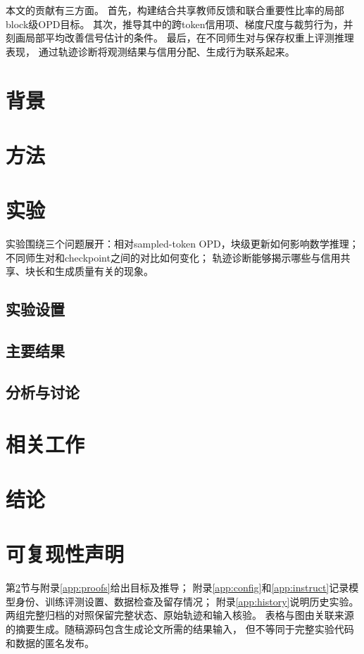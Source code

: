 本文的贡献有三方面。
首先，构建结合共享教师反馈和联合重要性比率的局部block级OPD目标。
其次，推导其中的跨token信用项、梯度尺度与裁剪行为，并刻画局部平均改善信号估计的条件。
最后，在不同师生对与保存权重上评测推理表现，
通过轨迹诊断将观测结果与信用分配、生成行为联系起来。

\section{背景}
\label{sec:background}


\section{方法}
\label{sec:method}


\section{实验}
实验围绕三个问题展开：相对sampled-token OPD，块级更新如何影响数学推理；
不同师生对和checkpoint之间的对比如何变化；
轨迹诊断能够揭示哪些与信用共享、块长和生成质量有关的现象。

\subsection{实验设置}
\label{sec:protocol}


\subsection{主要结果}
\label{sec:results}


\subsection{分析与讨论}
\label{sec:analysis}


\section{相关工作}
\label{sec:related}


\section{结论}

\FloatBarrier
\label{mainend}

\section*{可复现性声明}
第\ref{sec:method}节与附录\ref{app:proofs}给出目标及推导；
附录\ref{app:config}和\ref{app:instruct}记录模型身份、训练评测设置、数据检查及留存情况；
附录\ref{app:history}说明历史实验。
两组完整归档的对照保留完整状态、原始轨迹和输入核验。
表格与图由关联来源的摘要生成。随稿源码包含生成论文所需的结果输入，
但不等同于完整实验代码和数据的匿名发布。

